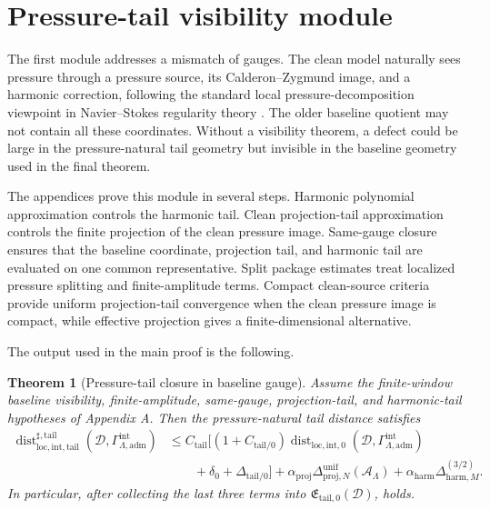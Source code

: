 \documentclass[11pt]{article}
\numberwithin{equation}{section}
\newtheorem{theorem}{Theorem}[section]
\theoremstyle{definition}
\theoremstyle{remark}
\newcommand{\loc}{\mathrm{loc}}
\newcommand{\intg}{\mathrm{int}}
\newcommand{\tail}{\mathrm{tail}}
\newcommand{\adm}{\mathrm{adm}}
\newcommand{\proj}{\mathrm{proj}}
\newcommand{\harm}{\mathrm{harm}}
\newcommand{\Dist}{\operatorname{dist}}
\newcommand{\calA}{\mathcal A}
\newcommand{\calD}{\mathcal D}
\begin{document}
\section{Pressure-tail visibility module}\label{sec:pressure-module-main}

The first module addresses a mismatch of gauges.  The clean model naturally sees pressure through a pressure source, its Calderon--Zygmund image, and a harmonic correction, following the standard local pressure-decomposition viewpoint in Navier--Stokes regularity theory \cite{SohrWahl1986,SereginSverak2002,SereginLectureNotes}.  The older baseline quotient may not contain all these coordinates.  Without a visibility theorem, a defect could be large in the pressure-natural tail geometry but invisible in the baseline geometry used in the final theorem.

The appendices prove this module in several steps.  Harmonic polynomial approximation controls the harmonic tail.  Clean projection-tail approximation controls the finite projection of the clean pressure image.  Same-gauge closure ensures that the baseline coordinate, projection tail, and harmonic tail are evaluated on one common representative.  Split package estimates treat localized pressure splitting and finite-amplitude terms.  Compact clean-source criteria provide uniform projection-tail convergence when the clean pressure image is compact, while effective projection gives a finite-dimensional alternative.

The output used in the main proof is the following.

\begin{theorem}[Pressure-tail closure in baseline gauge]\label{thm:main-pressure-tail-module}
Assume the finite-window baseline visibility, finite-amplitude, same-gauge, projection-tail, and harmonic-tail hypotheses of Appendix A.  Then the pressure-natural tail distance satisfies
\begin{equation}\label{eq:main-pressure-tail-module}
\begin{aligned}
\Dist^{\sharp,\tail}_{\loc,\intg,\tail}
(\calD,\Gamma^{\intg}_{\Lambda,\adm})
&\le
C_{\tail}
\bigl[
(1+C_{\tail/0})
\Dist_{\loc,\intg,0}
(\calD,\Gamma^{\intg}_{\Lambda,\adm})\\
&\qquad
+\delta_0+
\Delta_{\tail/0}
\bigr]
+
\alpha_{\proj}\Delta^{\mathrm{unif}}_{\proj,N}(\calA_\Lambda)
+
\alpha_{\harm}\Delta^{(3/2)}_{\harm,M}.
\end{aligned}
\end{equation}
In particular, after collecting the last three terms into \(\mathfrak E_{\tail,0}(\calD)\),  holds.
\end{theorem}
\end{document}
